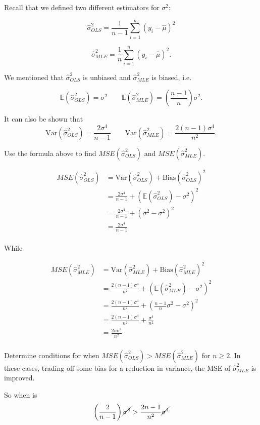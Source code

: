 \documentclass[
  letterpaper,
  DIV=11,
  numbers=noendperiod]{scrreport}
\begin{document}
Recall that we defined two different estimators for \(\sigma^2\):

\[\hat \sigma_{OLS}^2 = \frac{1}{n-1} \sum_{i=1}^n (y_i - \hat \mu)^2\]

\[ \hat \sigma^2_{MLE} = \frac{1}{n} \sum_{i=1}^n (y_i - \hat \mu)^2.\]

We mentioned that \(\hat \sigma^2_{OLS}\) is unbiased and
\(\hat \sigma^2_{MLE}\) is biased, i.e.

\[\mathbb E(\hat \sigma^2_{OLS}) = \sigma^2 \quad \quad \mathbb E(\hat \sigma^2_{MLE})= \left( 
\frac{n-1}{n}
\right) \sigma^2.\]

It can also be shown that
\[\text{Var}(\hat \sigma^2_{OLS}) = \frac{2 \sigma^4}{n-1} \quad \quad \text{Var}(\hat \sigma^2_{MLE}) = \frac{2(n-1)\sigma^4}{n^2}.\]

Use the formula above to find \(MSE(\hat \sigma^2_{OLS})\) and
\(MSE(\hat \sigma^2_{MLE})\).

\[\begin{aligned} 
MSE(\hat \sigma^2_{OLS}) & = \text{Var}(\hat \sigma^2_{OLS}) + \text{Bias}(\hat \sigma^2_{OLS})^2 \\ 
& = \frac{2\sigma^4}{n-1} + (\mathbb E(\hat \sigma^2_{OLS}) - \sigma^2)^2 \\ 
& = \frac{2\sigma^4}{n-1} + (\sigma^2 - \sigma^2)^2 \\ 
& = \frac{2\sigma^4}{n-1}\\ 
\end{aligned}\]

While

\[\begin{aligned} 
MSE(\hat \sigma^2_{MLE}) & = \text{Var}(\hat \sigma^2_{MLE}) + \text{Bias}(\hat \sigma^2_{MLE})^2 \\ 
& = \frac{2(n-1)\sigma^4}{n^2} + (\mathbb E(\hat \sigma^2_{MLE}) - \sigma^2)^2 \\ 
& = \frac{2(n-1)\sigma^4}{n^2} + (\frac{n-1}{n} \sigma^2 - \sigma^2)^2 \\ 
& = \frac{2(n-1)\sigma^4}{n^2} + \frac{\sigma^4}{n^2}\\ 
& = \frac{2n\sigma^4}{n^2}\\ 
\end{aligned}\]

Determine conditions for when
\(MSE(\hat \sigma^2_{OLS}) > MSE(\hat \sigma^2_{MLE})\) for
\(n \geq 2\). In these cases, trading off some bias for a reduction in
variance, the MSE of \(\hat \sigma^2_{MLE}\) is improved.

So when is \[\left( \frac{2}{n-1}\right) \cancel{\sigma^4} > 
\frac{2n-1}{n^2} \cancel{\sigma^4}\]
\end{document}

